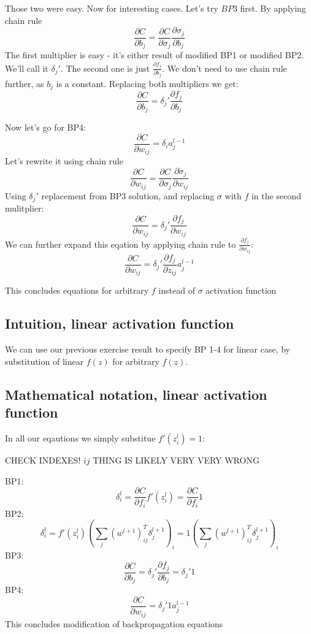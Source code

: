 \documentclass{article}
\begin{document}
Those two were easy. Now for interesting cases. Let's try $BP3$ first. By applying chain rule
$$\frac{\partial C}{\partial b_j} = \frac{\partial C}{\partial \sigma_j} \frac{\partial \sigma_j}{\partial b_j}$$
The first multiplier is easy - it's either result of modified BP1 or modified BP2. We'll call it $\delta_j'$.
The second one is just $\frac{\partial f_j}{\partial b_j}$. We don't need to use chain rule further, as $b_j$ is a constant.
Replacing both multipliers we get:
$$\frac{\partial C}{\partial b_j} = \delta_j' \frac{\partial f_j}{\partial b_j}$$

Now let's go for BP4:
$$\frac{\partial C}{\partial w_{ij}} = \delta_i a^{l-1}_{j}$$
Let's rewrite it using chain rule
$$\frac{\partial C}{\partial w_{ij}} = \frac{\partial C}{\partial \sigma_j} \frac{\partial \sigma_j}{\partial w_{ij}}$$
Using $\delta_j'$ replacement from BP3 solution, and replacing $\sigma$ with $f$ in the second mulitplier:
$$\frac{\partial C}{\partial w_{ij}} = \delta_j' \frac{\partial f_j}{\partial w_{ij}}$$
We can further expand this eqation by applying chain rule to $\frac{\partial f_j}{\partial w_{ij}}$:
$$\frac{\partial C}{\partial w_{ij}} = \delta_j' \frac{\partial f_j}{\partial z_{ij}} a^{l-1}_{j}$$

This concludes equations for arbitrary $f$ instead of $\sigma$ activation function

\subsection{Intuition, linear activation function}
We can use our previous exercise result to specify BP 1-4 for linear case, by substitution of linear $f(z)$ for arbitrary $f(z)$.
\subsection{Mathematical notation, linear activation function}
In all our eqautions we simply substitue $f'(z^l_i) = 1$:

CHECK INDEXES! ${ij}$ THING IS LIKELY VERY VERY WRONG

BP1:
$$\delta^l_i = \frac{\partial C}{\partial f_i} f'(z^l_i) = \frac{\partial C}{\partial f_i}  1$$
BP2:
$$\delta^l_i = f'(z_i^l) (\sum_j(w^{l+1})^T_{ij} \delta^{l+1}_j)_i = 1  (\sum_j(w^{l+1})^T_{ij} \delta^{l+1}_j)_i$$
BP3:
$$\frac{\partial C}{\partial b_j} = \delta_j' \frac{\partial f_j}{\partial b_j} = \delta_j'  1$$
BP4:
$$\frac{\partial C}{\partial w_{ij}} = \delta_j'  1  a^{l-1}_{j}$$
This concludes modification of backpropagation equations
\end{document}
